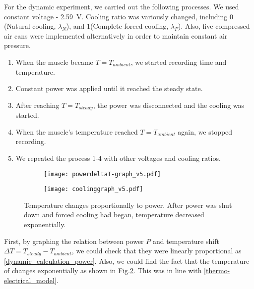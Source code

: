 For the dynamic experiment, we carried out the following processes. We used constant voltage - \SI{2.59}{\volt}. Cooling ratio was variously changed, including $0$(Natural cooling, $\lambda_{N}$), and $1$(Complete forced cooling, $\lambda_{F}$). Also, five compressed air cans were implemented alternatively in order to maintain constant air pressure. 
\begin{enumerate}
\item When the muscle became $T=T_{ambient}$, we started recording time and temperature.
\item Constant power was applied until it reached the steady state.
\item After reaching $T=T_{steady}$, the power was disconnected and the cooling was started. 
\item When the muscle's temperature reached $T=T_{ambient}$ again, we stopped recording. 
\item We repeated the process 1-4 with other voltages and cooling ratios.
\end{enumerate}


\begin{figure}[t]
	\centering
	\begin{subfigure}[t]{0.45\linewidth}
		\centering\texttt{[image: powerdeltaT-graph\_v5.pdf]}
		\caption{\label{powerdeltaT}}
	\end{subfigure}%
	\begin{subfigure}[t]{0.45\linewidth}
		\centering\texttt{[image: coolinggraph\_v5.pdf]}
		\caption{\label{coolinggraph}}
	\end{subfigure}
	\caption[Results of the dynamic experiment]{ Temperature changes proportionally to power.  After power was shut down and forced cooling had began, temperature decreased exponentially.}
	\label{result_dynamic}
\end{figure}

First, by graphing the relation between power $P$ and temperature shift $\Delta{T}=T_{steady}-T_{ambient}$, we could check that they were linearly proportional as \eqref{dynamic_calculation_power}.
Also, we could find the fact that the temperature of \scp changes exponentially as shown in Fig.\ref{coolinggraph}. This was in line with  \eqref{thermo-electrical_model}.

